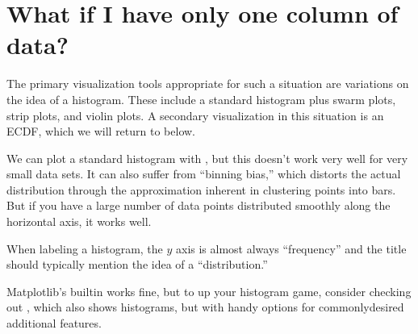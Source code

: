 \documentclass[letterpaper,10pt,english]{jupyterBook}
\begin{document}
\section{What if I have only one column of data?}
\label{\detokenize{chapter-10-visualization:what-if-i-have-only-one-column-of-data}}
\sphinxAtStartPar
The primary visualization tools appropriate for such a situation are variations on the idea of a histogram.  These include a standard histogram plus swarm plots, strip plots, and violin plots.  A secondary visualization in this situation is an ECDF, which we will return to below.

\sphinxAtStartPar
We can plot a standard histogram with , but this doesn’t work very well for very small data sets.  It can also suffer from “binning bias,” which distorts the actual distribution through the approximation inherent in clustering points into bars.  But if you have a large number of data points distributed smoothly along the horizontal axis, it works well.

\sphinxAtStartPar
When labeling a histogram, the \(y\) axis is almost always “frequency” and the title should typically mention the idea of a “distribution.”

\begin{sphinxVerbatim}[commandchars=\\\{\}]
 \PYG{p}{[}\PYG{p}{]} 
  
  
  
\end{sphinxVerbatim}

\noindent{}

\sphinxAtStartPar
Matplotlib’s built\sphinxhyphen{}in  works fine, but to up your histogram game, consider checking out , which also shows histograms, but with handy options for commonly\sphinxhyphen{}desired additional features.
\end{document}
